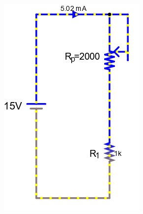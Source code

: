 \documentclass[a4paper]{article}
\begin{document}
\begin{figure}[H]
\begin{subfigure}{0.333\textwidth}
        \includegraphics[width=.9\linewidth]{pot8}
    \end{subfigure}
    \phantom{15em}
    \begin{subfigure}{0.333\textwidth}

\end{subfigure}
\end{figure}
\end{document}
